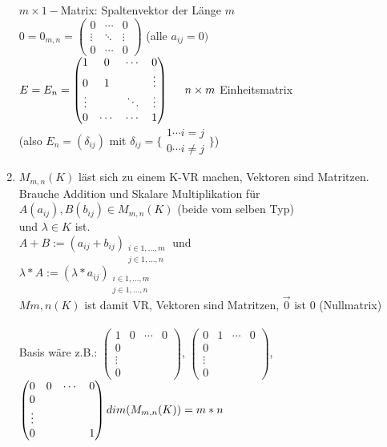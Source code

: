 \documentclass[a4paper,11pt]{article}
\begin{document}
\begin{enumerate}[label=\alph*)]
$m\times 1-$Matrix: Spaltenvektor der Länge $m$ \\
$0=0_{m,n}=\begin{pmatrix}0&\cdots&0\\\vdots&\ddots&\vdots\\0&\cdots&0\end{pmatrix}$ (alle $a_{ij}=0)$ \\
$E=E_n=\begin{pmatrix}1&0&\cdots&0\\0&1&&\vdots\\\vdots&&\ddots&\vdots\\0&\cdots&\cdots&1\end{pmatrix}\hspace{5mm}n\times m$ Einheitsmatrix \\
(also $E_n=(\delta_{ij})$ mit $\delta_{ij}=\{\substack{1\cdots i=j\\0\cdots i\neq j}\}$)
\item $M_{m,n}(K)$ läst sich zu einem K-VR machen, Vektoren sind Matritzen. Brauche Addition und Skalare Multiplikation für $A(a_{ij}),B(b_{ij})\in M_{m,n}(K)$ (beide vom selben Typ) \\
und $\lambda\in K$ ist. \\
$A+B:=(a_{ij}+b_{ij})_{\substack{i\in 1,...,m\\j\in 1,...,n}}$ und \\
$\lambda*A:=(\lambda*a_{ij})_{\substack{i\in 1,...,m\\j\in 1,...,n}}$ \\
$M{m,n}(K)$ ist damit VR, Vektoren sind Matritzen, $\overset{\rightarrow}{0}$ ist 0 (Nullmatrix) \\
\\Basis wäre z.B.: $\begin{pmatrix}1&0&\cdots&0\\0&&&\\\vdots&&&\\0\end{pmatrix}$, $\begin{pmatrix}0&1&\cdots&0\\0&&&\\\vdots&&&\\0\end{pmatrix}$, $\begin{pmatrix}0&0&\cdots&0\\0&&&\\\vdots&&&\\0&&&1\end{pmatrix} \\ dim(M_{m,n}(K))=m*n$

\end{enumerate}
\end{document}
